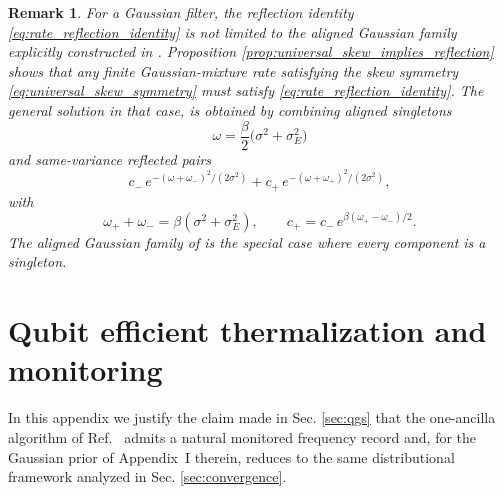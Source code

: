 \documentclass[showpacs,amsmath,amssymb,twocolumn,prx,superscriptaddress,10pt,aps,nofootinbib]{revtex4-2}
\newtheorem{remark}[theorem]{Remark}
\begin{document}
\begin{remark}
For a Gaussian filter, the reflection identity \eqref{eq:rate_reflection_identity} is not limited to the aligned Gaussian family explicitly constructed in \cite{Chen2023a}. Proposition \ref{prop:universal_skew_implies_reflection} shows that any finite Gaussian-mixture rate satisfying the skew symmetry \eqref{eq:universal_skew_symmetry} must satisfy \eqref{eq:rate_reflection_identity}. The general solution in that case, is obtained by combining aligned singletons
\begin{equation}
\omega=\frac{\beta}{2}\bigl(\sigma^2+\sigma_E^2\bigr)
\end{equation}
and same-variance reflected pairs
\begin{equation}
c_-\,e^{-(\omega+\omega_-)^2/(2\sigma^2)}
+
c_+\,e^{-(\omega+\omega_+)^2/(2\sigma^2)},
\end{equation}
with
\begin{equation}
\omega_+ + \omega_- = \beta(\sigma^2+\sigma_E^2),
\qquad
c_+ = c_-\,e^{\beta(\omega_+ - \omega_-)/2}.
\end{equation}
The aligned Gaussian family of \cite{Chen2023a} is the special case where every component is a singleton.
\end{remark}



\section{Qubit efficient thermalization and monitoring}
\label{app:qubit_efficient_monitoring}

In this appendix we justify the claim made in Sec. \ref{sec:qgs} that the one-ancilla algorithm of Ref.~\cite{Ding2025} admits a natural monitored frequency record and, for the Gaussian prior of Appendix~I therein, reduces to the same distributional framework analyzed in Sec. \ref{sec:convergence}.
\end{document}
